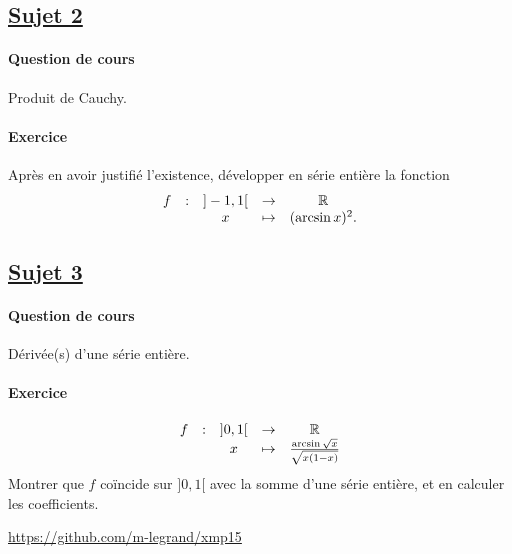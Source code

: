 \documentclass[12pt,a4paper]{report}
\begin{document}
\subsection*{\underline{Sujet 2}}

\paragraph*{Question de cours}
Produit de Cauchy.

\paragraph*{Exercice}
Après en avoir justifié l'existence, développer en série entière la fonction 
$$\begin{array}{ccccc}
f & : & ]-1,1[ & \to & \mathbb{R} \\
 & & x & \mapsto & (\arcsin x)^2 .\\
\end{array}$$

\subsection*{\underline{Sujet 3}}

\paragraph*{Question de cours}
Dérivée(s) d'une série entière.

\paragraph*{Exercice}
$$\begin{array}{ccccc}
f & : & ]0,1[ & \to & \mathbb{R} \\
 & & x & \mapsto & \frac{\arcsin \sqrt{x}}{\sqrt{x(1-x)}} \\
\end{array}$$
Montrer que $f$ coïncide sur $]0,1[$ avec la somme d'une série entière, et en calculer les coefficients.

\vfill

\begin{center}
\url{https://github.com/m-legrand/xmp15}
\end{center}
\end{document}
